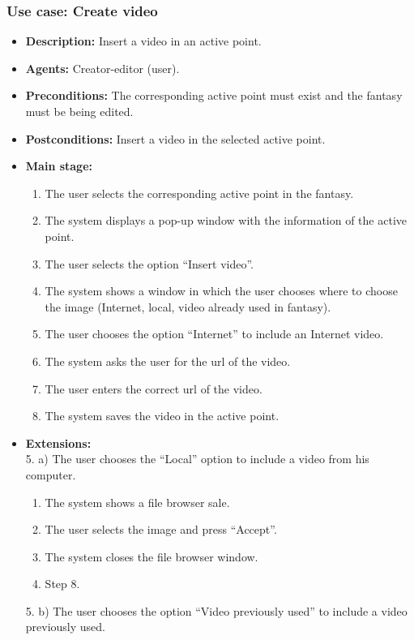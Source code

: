 \subsubsection{Use case: Create video}
\begin{itemize}
	\item \textbf{Description:} Insert a video in an active point.
	\item \textbf{Agents:} Creator-editor (user).
	\item \textbf{Preconditions:} The corresponding active point must exist and the fantasy must be being edited.
	\item \textbf{Postconditions:} Insert a video in the selected active point.
	\item \textbf{Main stage:}
	\begin{enumerate}
		\item The user selects the corresponding active point in the fantasy.
		\item The system displays a pop-up window with the information of the active point.
		\item The user selects the option ``Insert video''.
		\item The system shows a window in which the user chooses where to choose the image (Internet, local, video already used in fantasy).
		\item The user chooses the option ``Internet'' to include an Internet video.
		\item The system asks the user for the url of the video.
		\item The user enters the correct url of the video.
		\item The system saves the video in the active point.
	\end{enumerate}
	\item \textbf{Extensions:} \\ 5. a) The user chooses the ``Local'' option to include a video from his computer.
	\begin{enumerate}
		\item The system shows a file browser sale.
		\item The user selects the image and press ``Accept''.
		\item The system closes the file browser window.
		\item Step 8.
	\end{enumerate}
	5. b) The user chooses the option ``Video previously used'' to include a video previously used.
	\begin{enumerate}

\end{enumerate}
\end{itemize}
